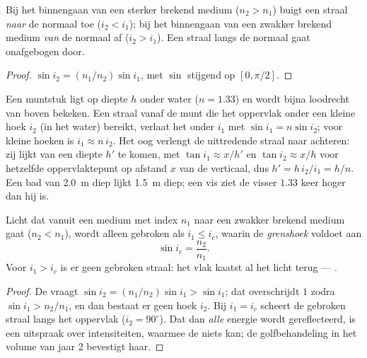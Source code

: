 \begin{proposition}\label{prop:b1:rays-reflection-refraction:bending}
Bij het binnengaan van een sterker brekend medium ($n_2 > n_1$) buigt een
straal \emph{naar} de normaal toe ($i_2 < i_1$); bij het binnengaan van een
zwakker brekend medium \emph{van} de normaal af ($i_2 > i_1$). Een straal
langs de normaal gaat onafgebogen door.
\end{proposition}

\begin{proof}
$\sin i_2 = (n_1/n_2)\sin i_1$, met $\sin$ stijgend op
$[0, \pi/2]$.
\end{proof}

\begin{example}\label{ex:b1:rays-reflection-refraction:depth}
Een muntstuk ligt op diepte $h$ onder water ($n = 1.33$) en wordt bijna
loodrecht van boven bekeken. Een straal vanaf de munt die het oppervlak onder
een kleine hoek $i_2$ (in het water) bereikt, verlaat het onder $i_1$ met
$\sin i_1 = n\sin i_2$; voor kleine hoeken is $i_1 \approx n\,i_2$. Het oog
verlengt de uittredende straal naar achteren: zij lijkt van een diepte $h'$ te
komen, met $\tan i_1 \approx x/h'$ en $\tan i_2 \approx x/h$ voor hetzelfde
oppervlaktepunt op afstand $x$ van de verticaal, dus $h' = h\,i_2/i_1 = h/n$.
Een bad van \qty{2.0}{m} diep lijkt \qty{1.5}{m} diep; een vis ziet de visser
$1.33$ keer hoger dan hij is.
\end{example}

\begin{theorem}\label{thm:b1:rays-reflection-refraction:tir}
Licht dat vanuit een medium met index $n_1$ naar een zwakker brekend medium
gaat ($n_2 < n_1$), wordt alleen gebroken als $i_1 \leq i_c$, waarin de
\emph{grenshoek} voldoet aan
\[
\sin i_c = \frac{n_2}{n_1} .
\]
Voor $i_1 > i_c$ is er geen gebroken straal: het vlak kaatst al het licht
terug --- \emph{}.
\end{theorem}

\begin{proof}
De  vraagt $\sin i_2 = (n_1/n_2)\sin i_1 > \sin i_1$; dat
overschrijdt $1$ zodra $\sin i_1 > n_2/n_1$, en dan bestaat er geen hoek $i_2$.
Bij $i_1 = i_c$ scheert de gebroken straal langs het oppervlak
($i_2 = 90^\circ$). Dat dan \emph{alle} energie wordt gereflecteerd, is een
uitspraak over intensiteiten, waarmee de  niets kan; de
golfbehandeling in het volume van jaar 2 bevestigt haar.
\end{proof}

